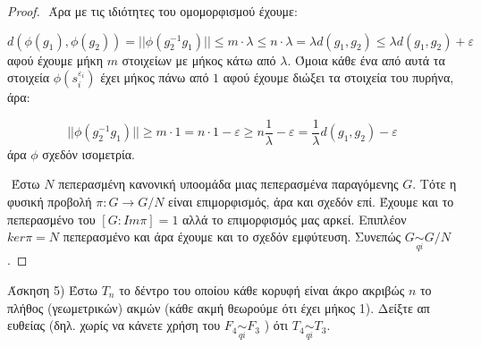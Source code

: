 \documentclass[oneside,a4paper]{article}
\begin{document}
\begin{proof}
$ $\newline
Άρα με τις ιδιότητες του ομομορφισμού έχουμε:

$$d(\phi(g_1),\phi(g_2)) = ||\phi(g^{-1}_2 g_1)|| \leq m \cdot \lambda  \leq n \cdot \lambda = \lambda d(g_1,g_2) \leq \lambda d(g_1,g_2) + \varepsilon$$ αφού έχουμε μήκη $m$ στοιχείων με μήκος κάτω από $\lambda$. Όμοια κάθε ένα από αυτά τα στοιχεία $\phi(s^{\varepsilon_i}_i)$ έχει μήκος πάνω από $1$ αφού έχουμε διώξει τα στοιχεία του πυρήνα, άρα:

$$ ||\phi(g^{-1}_2 g_1)|| \geq m \cdot 1  = n \cdot 1 - \varepsilon \geq n \frac{1}{\lambda} - \varepsilon = \frac{1}{\lambda} d(g_1,g_2) -\varepsilon$$ άρα $\phi$ σχεδόν ισομετρία.

$ $\newline
Έστω $N$ πεπερασμένη κανονική υποομάδα μιας πεπερασμένα παραγόμενης $G$. Τότε η φυσική προβολή $\pi : G\rightarrow G/N$ είναι επιμορφισμός, άρα και σχεδόν επί. Έχουμε και το πεπερασμένο του $[G:Im\pi] = 1$ αλλά το επιμορφισμός μας αρκεί. Επιπλέον $ker\pi = N$ πεπερασμένο και άρα έχουμε και το σχεδόν εμφύτευση. Συνεπώς $G \underset{qi}{\sim} G/N$.

\end{proof}




\pagebreak

\noindent Άσκηση 5) Έστω $T_n$ το δέντρο του οποίου κάθε κορυφή είναι άκρο ακριβώς $n$ το πλήθος (γεωμετρικών) ακμών (κάθε ακμή θεωρούμε ότι έχει μήκος 1). Δείξτε απ ευθείας (δηλ. χωρίς να κάνετε χρήση του $F_4 \underset{qi}{\sim} F_3$ ) ότι $T_4 \underset{qi}{\sim} T_3$.
\end{document}

